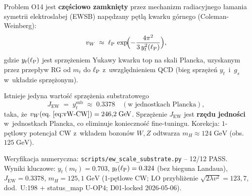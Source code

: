\begin{remark}%
\label{rem:O14-CW}
Problem O14 jest \textbf{częściowo zamknięty} przez mechanizm
radiacyjnego łamania symetrii elektroslabej (EWSB) napędzany
pętlą kwarku górnego (Coleman-Weinberg):
\begin{equation}\label{eq:vW-CW}
    v_W \;\approx\; \ell_{\mathrm{P}}\,\exp\!\Bigl(-\frac{4\pi^2}{3\,y_t^2(\ell_{\mathrm{P}})}\Bigr),
\end{equation}
gdzie $y_t(\ell_{\mathrm{P}})$ jest sprzężeniem Yukawy kwarku top na skali Plancka,
uzyskanym przez przepływ RG od $m_t$ do $\ell_{\mathrm{P}}$ z~uwzględnieniem QCD
(bieg sprzężeń $y_t$~i~$g_s$ w~układzie sprzężonym).

\begin{proposition}\label{prop:JEW}
Istnieje jedyna wartość sprzężenia substratowego
\begin{equation}\label{eq:JEW-value}
    J_{\mathrm{EW}} \;=\; y_t^{\mathrm{sub}} \;\approx\; 0.3378
    \quad (\text{w jednostkach Plancka}),
\end{equation}
taka, że $v_W(\text{eq.~\eqref{eq:vW-CW}}) = 246{,}2\;\mathrm{GeV}$.
Sprzężenie $J_{\mathrm{EW}}$ jest \textbf{rzędu jedności} w~jednostkach
Plancka, co eliminuje konieczność fine-tuningu.
Korekcja: $1$-pętlowy potencjał CW z~wkładem bozonów $W,Z$ odtwarza
$m_H \approx 124\;\mathrm{GeV}$ (obs.~$125\;\mathrm{GeV}$).
\end{proposition}

Weryfikacja numeryczna: \texttt{scripts/ew\_scale\_substrate.py} -- 12/12 PASS\@.
Wyniki kluczowe: $y_t(m_t) = 0.703$, $y_t(\ell_{\mathrm{P}}) = 0.324$ (bez bieguna Landaua),
$J_{\mathrm{EW}} = 0.3378$, $m_H = 125{,}1\;\mathrm{GeV}$ (1-p\k{e}tlowe CW; LO przybli\.zenie $\sqrt{2\lambda v^2} = 123{,}7$, dod.~U:198 + status\_map U-OP4; D01-locked 2026-05-06).
\end{remark}

